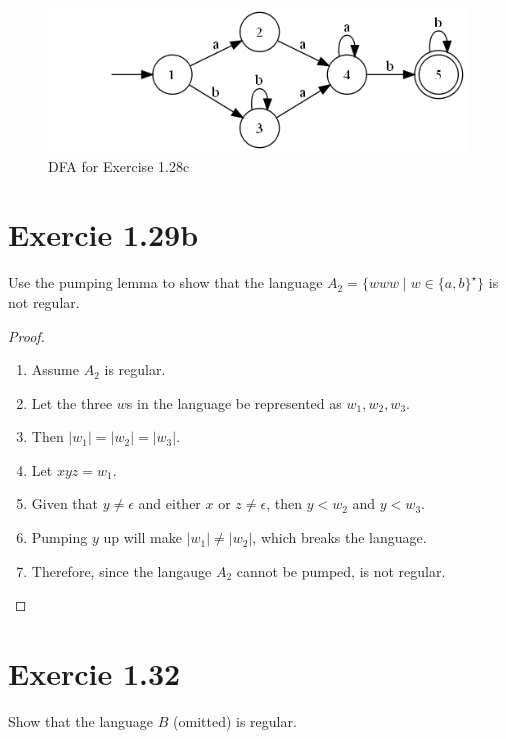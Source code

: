 \documentclass{article}
\newcommand{\where}{\mid}
\begin{document}
\begin{figure}[h!]
	\centering
	\includegraphics[height=1.5in]{1_28.png}
	\caption{DFA for Exercise 1.28c}
\end{figure}

\section{Exercie 1.29b}

Use the pumping lemma to show that the language $A_2 = \{ www \where w \in
\{a, b\}^\star \}$ is not regular.

\begin{proof}
	\mbox{}
	\begin{enumerate}
	  \item Assume $A_2$ is regular.
	  \item Let the three $w$s in the language be represented as $w_1, w_2, w_3$.
	  \item Then $|w_1| = |w_2| = |w_3|$.
	  \item Let $xyz = w_1$.
	  \item Given that $y \ne \epsilon$ and either $x$ or $z \ne \epsilon$, then
	  $y < w_2$ and $y < w_3$.
	  \item Pumping $y$ up will make $|w_1| \ne |w_2|$, which breaks the language.
	  \item Therefore, since the langauge $A_2$ cannot be pumped, is not regular.
	  \qedhere
	\end{enumerate}
\end{proof}

\section{Exercie 1.32}

Show that the language $B$ (omitted) is regular.
\end{document}
